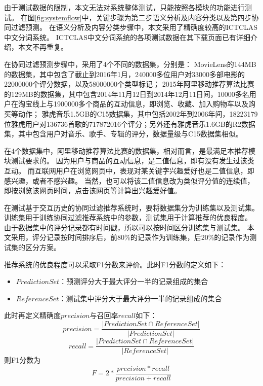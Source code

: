 由于测试数据的限制，本文无法对系统整体测试，只能按照各模块的功能进行测试。
在图\ref{fig:systemflow}中，关键步骤为第二步语义分析及内容分类以及第四步协同过滤预测。
在语义分析及内容分类步骤中，本文采用了精确度较高的ICTCLAS中文分词系统\parencite{Zhang2003CLA}。
ICTCLAS中文分词系统的各项测试数据在其下载页面已有详细介绍，本文不再重复。

在协同过滤预测步骤中，采用了4个不同的数据集，分别是：
MovieLens的144MB的数据集，其中包含了截止到2016年1月，240000多位用户对33000多部电影的22000000个评分数据，以及58000000个类型标记；
2015年阿里移动推荐算法比赛的129MB的数据集，其中包含2014年11月12日到2014年12月11日间，10000多名用户在淘宝线上与1900000多个商品的互动信息，即浏览、收藏、加入购物车以及购买等动作；
雅虎音乐1.5GB的C15数据集，其中包括2002年到2006年间，18223179位雅虎用户对136736首歌的717872016个评分；另外还有雅虎音乐1.6GB的R2数据集，其中包含用户对音乐、歌手、专辑的评分，数据量级与C15数据集相似。

在4个数据集中，阿里移动推荐算法比赛的数据集，相对而言，是最满足本推荐模块测试要求的。
因为用户与商品的互动信息，是二值信息，即有没有发生过该类互动。
而互联网用户在浏览网页中，表现对某关键字兴趣爱好也是二值信息，即感兴趣，或者不感兴趣。
当然，也可以将该二值信息改为类似评分值的连续值，即按浏览该网页时间，点击该网页等计算出兴趣爱好值。

在测试基于交互历史的协同过滤推荐系统时，要将数据集分为训练集以及测试集。
训练集用于训练协同过滤推荐系统中的参数，测试集用于计算推荐的优良程度。
由于数据集中的评分记录都有时间戳，所以可以按时间区分训练集与测试集。
本文采用，评分记录按时间排序后，前80\%的记录作为训练集，后20\%的记录作为测试集的区分方案。

推荐系统的优良程度可以采取F1分数来评价。此时F1分数的定义如下：
\begin{center}
\begin{itemize}
	\item $PredictionSet$：预测评分大于最大评分一半的记录组成的集合
	\item $ReferenceSet$：测试集中评分大于最大评分一半的记录组成的集合
\end{itemize}
\end{center}
此时再定义精确度$precision$与召回率$recall$如下：
\begin{equation}
precision= \frac{|PredictionSet\cap ReferenceSet|}{|PredictionSet|}
\end{equation}
\begin{equation}
recall= \frac{|PredictionSet\cap ReferenceSet|}{|ReferenceSet|}
\end{equation}
则F1分数为
\begin{equation}
F= 2* \frac{precision*recall}{precision+recall}
\end{equation}

